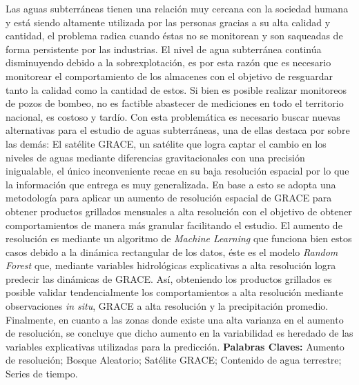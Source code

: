 Las aguas subterráneas tienen una relación muy cercana con la sociedad humana y está siendo altamente utilizada por las personas gracias a su
alta calidad y cantidad, el problema radica cuando éstas no se monitorean y son saqueadas de forma persistente por las industrias. El nivel de agua
subterránea continúa disminuyendo debido a la sobrexplotación, es por esta razón que es necesario monitorear el comportamiento de 
los almacenes con el objetivo de resguardar tanto la calidad como la cantidad de estos. Si bien es posible realizar monitoreos de pozos de bombeo, no es 
factible abastecer de mediciones en todo el territorio nacional, es costoso y tardío. Con esta problemática es necesario buscar nuevas alternativas para el estudio de 
aguas subterráneas, una de ellas destaca por sobre las demás: El satélite GRACE, un satélite que logra captar el cambio en los niveles de aguas mediante diferencias gravitacionales con una precisión inigualable,
el único inconveniente recae en su baja resolución espacial por lo que la información que entrega es muy
generalizada. En base a esto se adopta una metodología para aplicar un aumento de resolución espacial de GRACE para obtener productos grillados mensuales a alta resolución con el 
objetivo de obtener comportamientos de manera más granular facilitando el estudio. El aumento de resolución es mediante un algoritmo de \textit{Machine Learning} que funciona bien estos casos 
debido a la dinámica rectangular de los datos, éste es el modelo \textit{Random Forest} que, mediante variables hidrológicas explicativas a alta resolución logra predecir 
las dinámicas de GRACE. Así, obteniendo los productos grillados es posible validar tendencialmente
los comportamientos a alta resolución mediante observaciones \textit{in situ}, GRACE a alta resolución y la precipitación promedio.
Finalmente, en cuanto a las zonas donde existe una alta varianza en el aumento de resolución, se concluye que dicho aumento en la variabilidad es heredado de las variables explicativas utilizadas para la predicción.
\vskip 0.2in
\noindent
{\bf Palabras Claves:} Aumento de resolución; Bosque Aleatorio; Satélite GRACE; Contenido de agua terrestre; Series de tiempo.